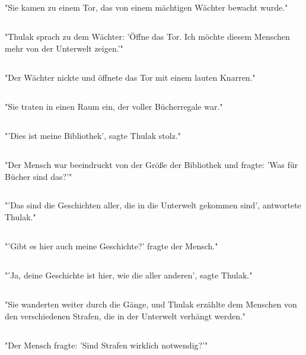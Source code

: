 \documentclass{article}
\begin{document}
\subsection{}
"Sie kamen zu einem Tor, das von einem mächtigen Wächter bewacht wurde."
\subsection{}
"Thulak sprach zu dem Wächter: 'Öffne das Tor. Ich möchte diesem Menschen mehr von der Unterwelt zeigen.'"
\subsection{}
"Der Wächter nickte und öffnete das Tor mit einem lauten Knarren."
\subsection{}
"Sie traten in einen Raum ein, der voller Bücherregale war."
\subsection{}
"'Dies ist meine Bibliothek', sagte Thulak stolz."
\subsection{}
"Der Mensch war beeindruckt von der Größe der Bibliothek und fragte: 'Was für Bücher sind das?'"
\subsection{}
"'Das sind die Geschichten aller, die in die Unterwelt gekommen sind', antwortete Thulak."
\subsection{}
"'Gibt es hier auch meine Geschichte?' fragte der Mensch."
\subsection{}
"'Ja, deine Geschichte ist hier, wie die aller anderen', sagte Thulak."
\subsection{}
"Sie wanderten weiter durch die Gänge, und Thulak erzählte dem Menschen von den verschiedenen Strafen, die in der Unterwelt verhängt werden."
\subsection{}
"Der Mensch fragte: 'Sind Strafen wirklich notwendig?'"
\end{document}

